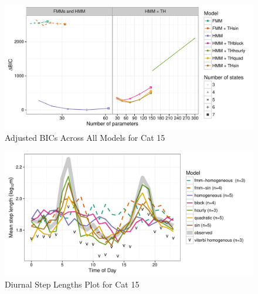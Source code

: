 \documentclass{article}\usepackage[]{graphicx}\usepackage{xcolor}
\makeatletter
\def\maxwidth{ %
  \ifdim\Gin@nat@width>\linewidth
    \linewidth
  \else
    \Gin@nat@width
  \fi
}
\newenvironment{knitrout}{}{} %
\makeatother
\begin{document}
\clearpage

\begin{knitrout}
\color{fgcolor}\begin{figure}
\includegraphics[width=\maxwidth]{figure/adj_BIC_comparisons15-1} \caption[Adjusted BICs Across All Models for Cat 15]{Adjusted BICs Across All Models for Cat 15}\label{fig:adj_BIC_comparisons15}
\end{figure}


\end{knitrout}

\clearpage

\begin{knitrout}
\color{fgcolor}\begin{figure}
\includegraphics[width=\maxwidth]{figure/avg_step_length_by_time15-1} \caption[Diurnal Step Lengths Plot for Cat 15]{Diurnal Step Lengths Plot for Cat 15}\label{fig:avg_step_length_by_time15}
\end{figure}


\end{knitrout}

\clearpage
\end{document}
